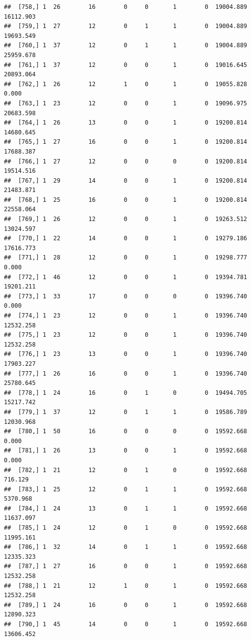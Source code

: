 \documentclass[
]{article}
\begin{document}
\begin{verbatim}
##  [758,] 1  26        16        0     0       1        0  19004.889  16112.903
##  [759,] 1  27        12        0     1       1        0  19004.889  19693.549
##  [760,] 1  37        12        0     1       1        0  19004.889  25959.678
##  [761,] 1  37        12        0     0       1        0  19016.645  20893.064
##  [762,] 1  26        12        1     0       1        0  19055.828      0.000
##  [763,] 1  23        12        0     0       1        0  19096.975  20683.598
##  [764,] 1  26        13        0     0       1        0  19200.814  14680.645
##  [765,] 1  27        16        0     0       1        0  19200.814  17688.387
##  [766,] 1  27        12        0     0       0        0  19200.814  19514.516
##  [767,] 1  29        14        0     0       1        0  19200.814  21483.871
##  [768,] 1  25        16        0     0       1        0  19200.814  22558.064
##  [769,] 1  26        12        0     0       1        0  19263.512  13024.597
##  [770,] 1  22        14        0     0       1        0  19279.186  17616.773
##  [771,] 1  28        12        0     0       1        0  19298.777      0.000
##  [772,] 1  46        12        0     0       1        0  19394.781  19201.211
##  [773,] 1  33        17        0     0       0        0  19396.740      0.000
##  [774,] 1  23        12        0     0       1        0  19396.740  12532.258
##  [775,] 1  23        12        0     0       1        0  19396.740  12532.258
##  [776,] 1  23        13        0     0       1        0  19396.740  17903.227
##  [777,] 1  26        16        0     0       1        0  19396.740  25780.645
##  [778,] 1  24        16        0     1       0        0  19494.705  15217.742
##  [779,] 1  37        12        0     1       1        0  19586.789  12030.968
##  [780,] 1  50        16        0     0       0        0  19592.668      0.000
##  [781,] 1  26        13        0     0       1        0  19592.668      0.000
##  [782,] 1  21        12        0     1       0        0  19592.668    716.129
##  [783,] 1  25        12        0     1       1        0  19592.668   5370.968
##  [784,] 1  24        13        0     1       1        0  19592.668  11637.097
##  [785,] 1  24        12        0     1       0        0  19592.668  11995.161
##  [786,] 1  32        14        0     1       1        0  19592.668  12335.323
##  [787,] 1  27        16        0     0       1        0  19592.668  12532.258
##  [788,] 1  21        12        1     0       1        0  19592.668  12532.258
##  [789,] 1  24        16        0     0       1        0  19592.668  12890.323
##  [790,] 1  45        14        0     0       1        0  19592.668  13606.452

\end{verbatim}
\end{document}
